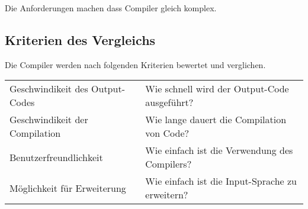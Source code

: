 Die Anforderungen machen dass Compiler gleich komplex.

\subsection{Kriterien des Vergleichs}
Die Compiler werden nach folgenden Kriterien bewertet und verglichen.

\begin{table}[h!]
    \begin{tabular}{l|l}
    Geschwindikeit des Output-Codes     & Wie schnell wird der Output-Code ausgeführt?                      \\
    Geschwindikeit der Compilation      & Wie lange dauert die Compilation von Code?                        \\
    Benutzerfreundlichkeit              & Wie einfach ist die Verwendung des Compilers?                     \\
    Möglichkeit für Erweiterung         & Wie einfach ist die Input-Sprache zu erweitern?                                 
    \end{tabular}
\end{table}